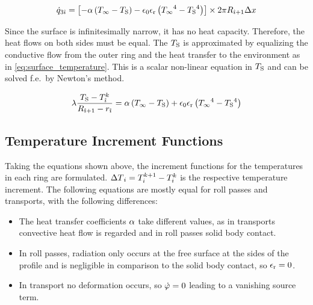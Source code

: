\documentclass{PyRollDocs}
\begin{document}
    \begin{equation}
        {\dot{q}}_{3{\hat{\imath}}} = \left[ -{\alpha} \left( {T_\infty} - {T_\mathrm{S}} \right) - {\epsilon_0}{\epsilon_\mathrm{r}}\left( {T_\infty}^4 - {T_\mathrm{S}}^4 \right) \right]
        \times 2 \pi {R}_{{\hat{\imath}}+1} {\Delta x}
        \label{eq:heat_flow_3_surface}
    \end{equation}

    Since the surface is infinitesimally narrow, it has no heat capacity.
    Therefore, the heat flows on both sides must be equal.
    The ${T_\mathrm{S}}$ is approximated by equalizing the conductive flow from the outer ring and the heat transfer to the environment as in \autoref{eq:surface_temperature}.
    This is a scalar non-linear equation in ${T_\mathrm{S}}$ and can be solved f.e.\ by Newton's method.

    \begin{equation}
        {\lambda} \frac{{T_\mathrm{S}} - {T}_{\hat{\imath}}^{k}}{{R}_{{\hat{\imath}}+1} - {r}_{{\hat{\imath}}}} = {\alpha} \left( {T_\infty} - {T_\mathrm{S}} \right) + {\epsilon_0}{\epsilon_\mathrm{r}}\left( {T_\infty}^4 - {T_\mathrm{S}}^4 \right)
        \label{eq:surface_temperature}
    \end{equation}

    \subsection{Temperature Increment Functions}

    Taking the equations shown above, the increment functions for the temperatures in each ring are formulated.
    ${\Delta T}_{i} = {T}_{{i}}^{{k}+1} - {T}_{{i}}^{{k}}$ is the respective temperature increment.
    The following equations are mostly equal for roll passes and transports, with the following differences:
    \begin{itemize}
        \item The heat transfer coefficients ${\alpha}$ take different values, as in transports convective heat flow is regarded and in roll passes solid body contact.
        \item In roll passes, radiation only occurs at the free surface at the sides of the profile and is negligible in comparison to the solid body contact, so ${\epsilon_\mathrm{r}} = 0$.
        \item In transport no deformation occurs, so ${\dot{\varphi}}=0$ leading to a vanishing source term.
    \end{itemize}
\end{document}

